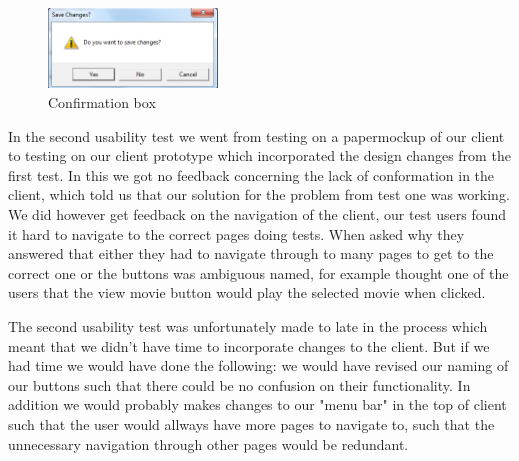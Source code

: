 \begin{figure}[h!]
  \centering
\includegraphics[width=0.4\textwidth]{Parts/Images/Design/Confirmationbox}
\caption{Confirmation box}
\label{fig:Design_Client_GUI_Usability_popup}
\end{figure}

In the second usability test we went from testing on a papermockup of our client to testing on our client prototype which incorporated the design changes from the first test. In this we got no feedback concerning the lack of conformation in the client, which told us that our solution for the problem from test one was working. We did however get feedback on the navigation of the client, our test users found it hard to navigate to the correct pages doing tests. When asked why they answered that either they had to navigate through to many pages to get to the correct one or the buttons was ambiguous named, for example thought one of the users that the view movie button would play the selected movie when clicked.

The second usability test was unfortunately made to late in the process which meant that we didn't have time to incorporate changes to the client. But if we had time we would have done the following: we would have revised our naming of our buttons such that there could be no confusion on their functionality. In addition we would probably makes changes to our "menu bar" in the top of client such that the user would allways have more pages to navigate to, such that the unnecessary navigation through other pages would be redundant.
